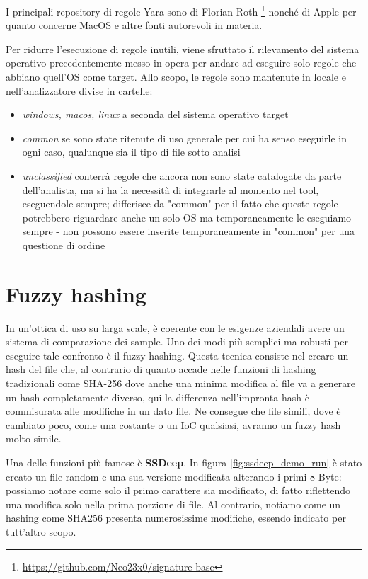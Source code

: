 I principali repository di regole Yara sono di Florian Roth
\footnote{\url{https://github.com/Neo23x0/signature-base}}
nonché di Apple per quanto concerne MacOS e altre fonti autorevoli in materia.

Per ridurre l'esecuzione di regole inutili, viene sfruttato il rilevamento del sistema operativo precedentemente messo in opera per andare ad eseguire solo regole che abbiano quell'OS come target.
Allo scopo, le regole sono mantenute in locale e nell'analizzatore divise in cartelle:
\begin{itemize}
    \item \emph{windows, macos, linux} a seconda del sistema operativo target
    \item \emph{common} se sono state ritenute di uso generale per cui ha senso eseguirle in ogni caso, qualunque sia il tipo di file sotto analisi
    \item \emph{unclassified} conterrà regole che ancora non sono state catalogate da parte dell'analista, ma si ha la necessità di integrarle al momento nel tool, eseguendole sempre; differisce da "common" per il fatto che queste regole potrebbero riguardare anche un solo OS ma temporaneamente le eseguiamo sempre - non possono essere inserite temporaneamente in "common" per una questione di ordine
\end{itemize}

\section{Fuzzy hashing}
In un'ottica di uso su larga scale, è coerente con le esigenze aziendali avere un sistema di comparazione dei sample. Uno dei modi più semplici ma robusti per eseguire tale confronto è il fuzzy hashing. Questa tecnica consiste nel creare un hash del file che, al contrario di quanto accade nelle funzioni di hashing tradizionali come SHA-256 dove anche una minima modifica al file va a generare un hash completamente diverso, qui la differenza nell'impronta hash è commisurata alle modifiche in un dato file. Ne consegue che file simili, dove è cambiato poco, come una costante o un IoC qualsiasi, avranno un fuzzy hash molto simile.

Una delle funzioni più famose è \textbf{SSDeep}.
In figura \ref{fig:ssdeep_demo_run} è stato creato un file random e una sua versione modificata alterando i primi 8 Byte: possiamo notare come solo il primo carattere sia modificato, di fatto riflettendo una modifica solo nella prima porzione di file. Al contrario, notiamo come un hashing come SHA256 presenta numerosissime modifiche, essendo indicato per tutt'altro scopo.

